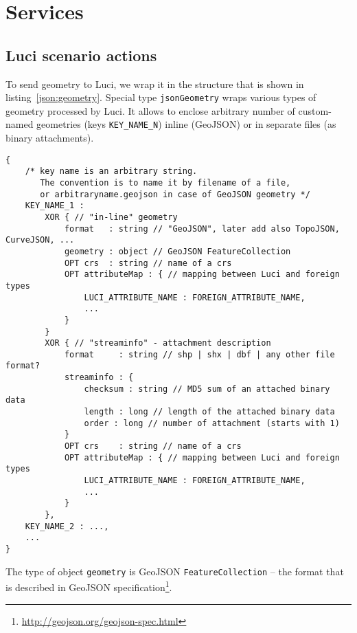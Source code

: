 \section{Services}
\label{ch:services}

\subsection{\acs{Luci} scenario actions}
\label{sec:services:actions}


To send geometry to \ac{Luci}, we wrap it in the structure that is shown in listing~\ref{json:geometry}.
Special type \texttt{\color{blue}jsonGeometry} wraps various types of geometry processed by \ac{Luci}.
It allows to enclose arbitrary number of custom-named geometries (keys \texttt{KEY\_NAME\_N}) inline (GeoJSON) or in separate files (as binary attachments).
%
\begin{lstlisting}[caption={structure of \texttt{\color{blue}jsonGeometry} data type}, label={json:geometry}]
{
	/* key name is an arbitrary string.
	   The convention is to name it by filename of a file,
	   or arbitraryname.geojson in case of GeoJSON geometry */
	KEY_NAME_1 :
		XOR { // "in-line" geometry
			format   : string // "GeoJSON", later add also TopoJSON, CurveJSON, ...
			geometry : object // GeoJSON FeatureCollection
			OPT crs  : string // name of a crs
			OPT attributeMap : { // mapping between Luci and foreign types
				LUCI_ATTRIBUTE_NAME : FOREIGN_ATTRIBUTE_NAME,
				...
			}
		}
		XOR { // "streaminfo" - attachment description
			format     : string // shp | shx | dbf | any other file format?
			streaminfo : {
				checksum : string // MD5 sum of an attached binary data
				length : long // length of the attached binary data
				order : long // number of attachment (starts with 1)
			}
			OPT crs    : string // name of a crs
			OPT attributeMap : { // mapping between Luci and foreign types
				LUCI_ATTRIBUTE_NAME : FOREIGN_ATTRIBUTE_NAME,
				...
			}
		},
	KEY_NAME_2 : ...,
	...
}
\end{lstlisting}
%
The type of object \texttt{geometry} is GeoJSON \texttt{FeatureCollection} -- the format that is described in GeoJSON specification\footnote{\url{http://geojson.org/geojson-spec.html}}.


